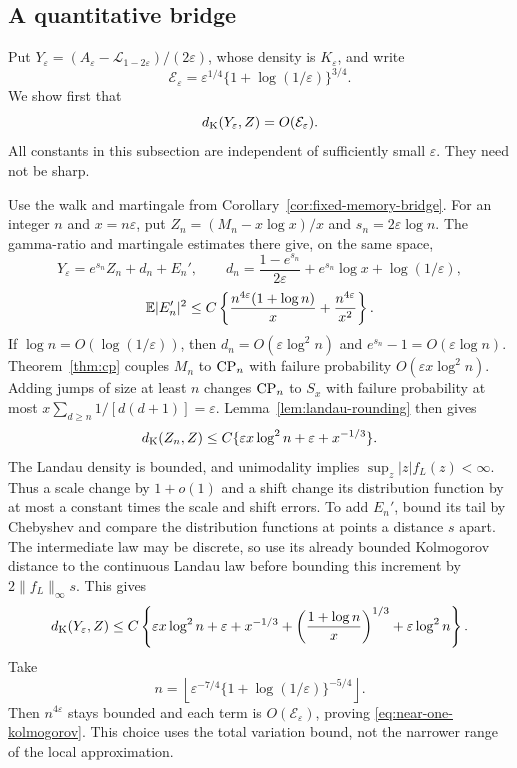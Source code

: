 \subsection{A quantitative bridge}

Put $Y_\varepsilon=(A_\varepsilon-\mathcal L_{1-2\varepsilon})/(2\varepsilon)$,
whose density is $K_\varepsilon$, and write
\[
 \mathcal E_\varepsilon
 =\varepsilon^{1/4}\{1+\log(1/\varepsilon)\}^{3/4}.
\]
We show first that
\begin{equation}\label{eq:near-one-kolmogorov}
 d_{\rm K}(Y_\varepsilon,Z)=O(\mathcal E_\varepsilon).
\end{equation}
All constants in this subsection are independent of sufficiently
small $\varepsilon$. They need not be sharp.

Use the walk and martingale from Corollary~\ref{cor:fixed-memory-bridge}.
For an integer $n$ and $x=n\varepsilon$, put
$Z_n=(M_n-x\log x)/x$ and $s_n=2\varepsilon\log n$.
The gamma-ratio and martingale estimates there give, on the same space,
\[
 Y_\varepsilon=e^{s_n}Z_n+d_n+E_n',\qquad
 d_n=\frac{1-e^{s_n}}{2\varepsilon}
       +e^{s_n}\log x+\log(1/\varepsilon),
\]
\[
 \mathbb{E}|E_n'|^2\le C\left\{
       \frac{n^{4\varepsilon}(1+\log n)}x
       +\frac{n^{4\varepsilon}}{x^2}\right\}.
\]
If $\log n=O(\log(1/\varepsilon))$, then
$d_n=O(\varepsilon\log^2 n)$ and $e^{s_n}-1=O(\varepsilon\log n)$.
Theorem~\ref{thm:cp} couples $M_n$ to $\mathrm{CP}_n$ with failure probability
$O(\varepsilon x\log^2 n)$. Adding jumps of size at least $n$
changes $\mathrm{CP}_n$ to $S_x$ with failure probability at most
$x\sum_{d\ge n}1/[d(d+1)]=\varepsilon$.
Lemma~\ref{lem:landau-rounding} then gives
\[
 d_{\rm K}(Z_n,Z)
 \le C\{\varepsilon x\log^2 n+\varepsilon+x^{-1/3}\}.
\]
The Landau density is bounded, and unimodality implies
$\sup_z|z|f_L(z)<\infty$. Thus a scale change by $1+o(1)$ and a
shift change its distribution function by at most a constant times
the scale and shift errors. To add $E_n'$, bound its tail by
Chebyshev and compare the distribution functions at points a distance
$s$ apart. The intermediate law may be discrete, so use its already
bounded Kolmogorov distance to the continuous Landau law before
bounding this increment by $2\|f_L\|_\infty s$.
This gives
\[
 d_{\rm K}(Y_\varepsilon,Z)
 \le C\left\{\varepsilon x\log^2 n+\varepsilon+x^{-1/3}
       +\left(\frac{1+\log n}{x}\right)^{1/3}
       +\varepsilon\log^2 n\right\}.
\]
Take
\[
 n=\left\lfloor\varepsilon^{-7/4}
       \{1+\log(1/\varepsilon)\}^{-5/4}\right\rfloor.
\]
Then $n^{4\varepsilon}$ stays bounded and each term is
$O(\mathcal E_\varepsilon)$, proving \eqref{eq:near-one-kolmogorov}.
This choice uses the total variation bound, not the narrower range
of the local approximation.

